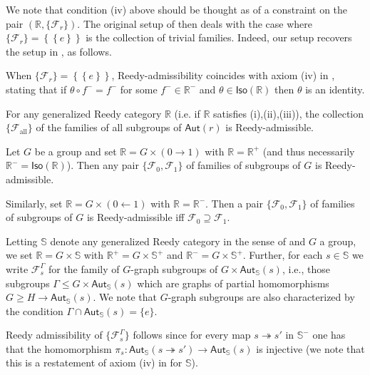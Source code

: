 \documentclass[a4paper,10pt
,draft
]{article}%
\begin{document}
We note that condition (iv) above should be thought as of a constraint on the pair 
$(\mathbb{R},\{\mathcal{F}_r\})$.
The original setup of \cite{BM11} then deals with the case
where $\{ \mathcal{F}_r \} =
 \left\{ \left\{ e \right\} \right\}$
is the collection of trivial families. Indeed, our setup recovers
the setup in \cite{BM11}, as follows.

\begin{example}
	When $\{ \mathcal{F}_r \} =
 \left\{ \left\{ e \right\} \right\}$, Reedy-admissibility coincides with axiom (iv) in \cite[Def. 1.1]{BM11},
stating that if $\theta \circ f^{-} = f^{-}$
for some $f^- \in \mathbb{R}^{-}$ and 
$\theta \in \mathsf{Iso}(\mathbb{R})$ then $\theta$ is an identity.
\end{example}

\begin{example}
For any generalized Reedy category $\mathbb{R}$
(i.e. if $\mathbb{R}$ satisfies (i),(ii),(iii)),
the collection $\{\mathcal{F}_{\text{all}}\}$
of the families of all subgroups of $\mathsf{Aut}(r)$
is Reedy-admissible.
\end{example}

\begin{example}
	Let $G$ be a group and set $\mathbb{R} = G \times (0 \to 1)$ with $\mathbb{R} = \mathbb{R}^+$
	(and thus necessarily $\mathbb{R}^- = \mathsf{Iso}(\mathbb{R})$).
	Then any pair 
	$\{\mathcal{F}_0,\mathcal{F}_1\}$
	of families of subgroups of $G$ is Reedy-admissible.
	
	Similarly, set $\mathbb{R} = G \times (0 \leftarrow 1)$
	with $\mathbb{R} = \mathbb{R}^-$. Then a pair
	$\{\mathcal{F}_0,\mathcal{F}_1\}$
	of families of subgroups of $G$ is Reedy-admissible
	iff $\mathcal{F}_0 \supseteq \mathcal{F}_1$.
\end{example}


\begin{example}\label{GGRAPHREEDY EX}
	Letting $\mathbb{S}$ denote any generalized Reedy category in the sense of \cite[Def. 1.1]{BM11} and $G$ a group,
	we set $\mathbb{R} = G \times \mathbb{S}$
	with $\mathbb{R}^+ = G \times \mathbb{S}^+$ and 
	$\mathbb{R}^- = G \times \mathbb{S}^+$.
	Further, for each $s \in \mathbb{S}$ we write
	$\mathcal{F}_s^{\Gamma}$ for the family of 
	$G$-graph subgroups of $G \times \mathsf{Aut}_{\mathbb{S}}(s)$, i.e., those subgroups 
	$\Gamma \leq G \times \mathsf{Aut}_{\mathbb{S}}(s)$ 
	which are graphs of partial homomorphisms
	$G \geq H \to \mathsf{Aut}_{\mathbb{S}}(s)$. We note that $G$-graph subgroups are also characterized by the condition $\Gamma \cap \mathsf{Aut}_{\mathbb{S}}(s) = \{e\}$.
	
	Reedy admissibility of $\{\mathcal{F}_s^{\Gamma}\}$ follows since for every map 
	$s \twoheadrightarrow s'$ in $\mathbb{S}^-$ one has that the homomorphism
	$\pi_s \colon \mathsf{Aut}_{\mathbb{S}}(s \twoheadrightarrow s')
	\to \mathsf{Aut}_{\mathbb{S}}(s)$ is injective
	(we note that this is a restatement of axiom (iv) in \cite[Def. 1.1]{BM11} for $\mathbb{S}$).
\end{example}
\end{document}
